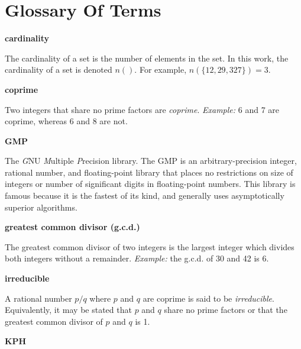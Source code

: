 
\chapter{Glossary Of Terms}

\label{cglo0}

\begin{vworktermglossaryenum}


\item \textbf{cardinality}

      The cardinality of a set is the
      number of elements in the set.  In this work, the cardinality
      of a set is denoted $n()$.  For example, 
      $n(\{12,29,327\}) = 3$.

\item \textbf{coprime}

      Two integers that share no prime factors are \emph{coprime}.
      \emph{Example:}
      6 and 7 are coprime, whereas 6 and 8 are not.

\item \textbf{GMP}

      The \emph{G}NU \emph{M}ultiple \emph{P}recision library.
      The GMP is an arbitrary-precision integer, rational number,
      and floating-point library that places no restrictions on
      size of integers or number of significant digits in floating-point
      numbers.  This 
      library is famous because it is the fastest of its
      kind, and generally uses asymptotically superior algorithms.

\item \textbf{greatest common divisor (g.c.d.)}

      The greatest common divisor of two integers is the largest
      integer which divides both integers without a remainder.
      \emph{Example:} the g.c.d. of 30 and 42 is 6.

\item \textbf{irreducible}

      A rational number $p/q$ where $p$ and $q$ are coprime
      is said to be \emph{irreducible}.
      Equivalently, it may be stated that $p$ and $q$ share no prime factors
      or that the greatest common divisor of
      $p$ and $q$ is 1.

\item \textbf{KPH}


\end{vworktermglossaryenum}
